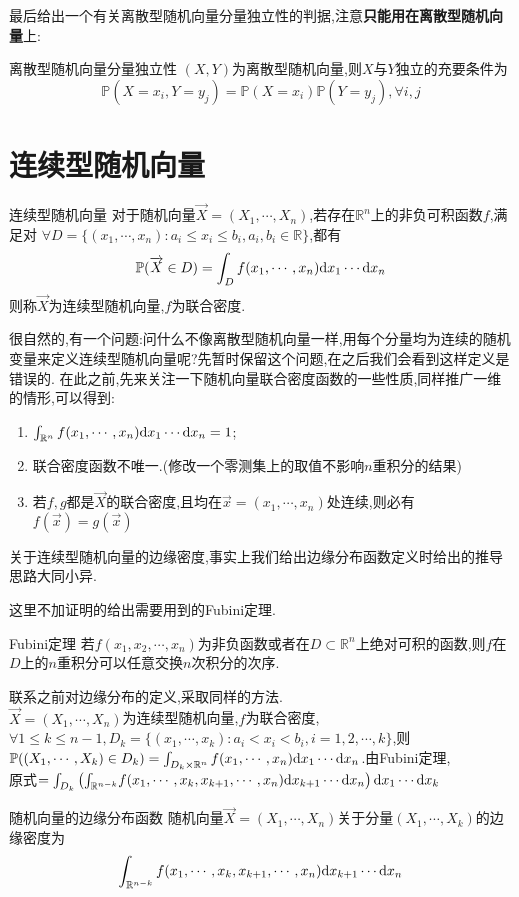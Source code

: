 最后给出一个有关离散型随机向量分量独立性的判据,注意\textbf{只能用在离散型随机向量}上:
\begin{theorem}{离散型随机向量分量独立性}{}
    $(X,Y)$为离散型随机向量,则$X$与$Y$独立的充要条件为
    $$\mathbb{P}(X=x_i,Y=y_j)=\mathbb{P}(X=x_i)\mathbb{P}(Y=y_j),\forall i,j$$
\end{theorem}
\newpage
\section{连续型随机向量}
\begin{definition}{连续型随机向量}{}
    对于随机向量$\overrightarrow{X}=(X_1,\cdots,X_n)$,若存在$\mathbb{R}^n$上的非负可积函数$f$,满足对
    $\forall D=\{(x_1,\cdots,x_n):a_i\leq x_i\leq b_i,a_i,b_i\in\mathbb{R}\}$,都有
    $$\mathbb{P}(\overrightarrow{X}\in D)=\int_D f(x_1,\cdots,x_n) {\rm d}x_1\cdots {\rm d}x_n$$
    则称$\overrightarrow{X}$为连续型随机向量,$f$为联合密度.
\end{definition}

很自然的,有一个问题:问什么不像离散型随机向量一样,用每个分量均为连续的随机变量来定义连续型随机向量呢?先暂时保留这个问题,在之后我们会看到这样定义是错误的.
在此之前,先来关注一下随机向量联合密度函数的一些性质,同样推广一维的情形,可以得到:
\begin{enumerate}
    \item $\int_{\mathbb{R}^n}f(x_1,\cdots,x_n){\rm d}x_1\cdots{\rm d}x_n=1$;
    \item 联合密度函数不唯一.(修改一个零测集上的取值不影响$n$重积分的结果)
    \item 若$f,g$都是$\overrightarrow{X}$的联合密度,且均在$\overrightarrow{x}=(x_1,\cdots,x_n)$处连续,则必有$f(\overrightarrow{x})=g(\overrightarrow{x})$
\end{enumerate}
关于连续型随机向量的边缘密度,事实上我们给出边缘分布函数定义时给出的推导思路大同小异.

这里不加证明的给出需要用到的Fubini定理.
\begin{theorem}{Fubini定理}{}
    若$f(x_1,x_2,\cdots,x_n)$为非负函数或者在$D\subset\mathbb{R}^n$上绝对可积的函数,则$f$在$D$上的$n$重积分可以任意交换$n$次积分的次序.
\end{theorem}
联系之前对边缘分布的定义,采取同样的方法.\\
$\overrightarrow{X}=(X_1,\cdots,X_n)$为连续型随机向量,$f$为联合密度,$\forall 1\leq k\leq n-1,D_k=\{(x_1,\cdots,x_k):a_i<x_i<b_i,i=1,2,\cdots,k\}$,则
$\mathbb{P}((X_1,\cdots,X_k)\in D_k)=\int_{D_k\times\mathbb{R}^n}f(x_1,\cdots,x_n){\rm d}x_1\cdots{\rm d}x_n$.由Fubini定理,\\
原式$=\int_{D_k}\left({\int_{\mathbb{R}^{n-k}}}f(x_1,\cdots,x_k,x_{k+1},\cdots,x_n){\rm d}x_{k+1}\cdots{\rm d}x_n\right){\rm d}x_1\cdots{\rm d}x_k$
\begin{definition}{随机向量的边缘分布函数}{}
    随机向量$\overrightarrow{X}=(X_1,\cdots,X_n)$关于分量$(X_1,\cdots,X_k)$的边缘密度为
    $$\int_{\mathbb{R}^{n-k}}f(x_1,\cdots,x_k,x_{k+1},\cdots,x_n){\rm d}x_{k+1}\cdots{\rm d}x_n$$
\end{definition}

